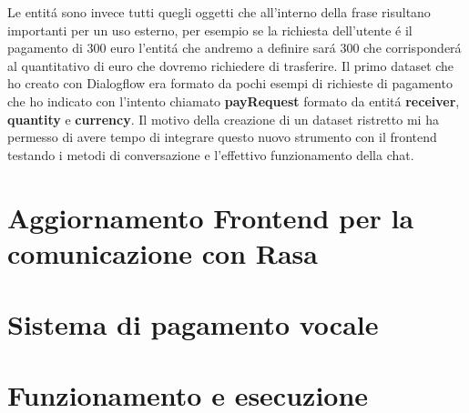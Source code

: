 Le entit\'a sono invece tutti quegli oggetti che all'interno della frase risultano importanti per un uso esterno, per esempio se la richiesta dell'utente \'e il pagamento di 300 euro l'entit\'a che andremo a definire sar\'a 300 che corrisponder\'a al quantitativo di euro che dovremo richiedere di trasferire.  
Il primo dataset che ho creato con Dialogflow era formato da pochi esempi di richieste di pagamento che ho indicato con l'intento chiamato \textbf{payRequest} formato da entit\'a \textbf{receiver}, \textbf{quantity} e \textbf{currency}.
Il motivo della creazione di un dataset ristretto mi ha permesso di avere tempo di integrare questo nuovo strumento con il frontend testando i metodi di conversazione e l'effettivo funzionamento della chat.

\section{Aggiornamento Frontend per la comunicazione con Rasa}

\section{Sistema di pagamento vocale}

\section{Funzionamento e esecuzione}

